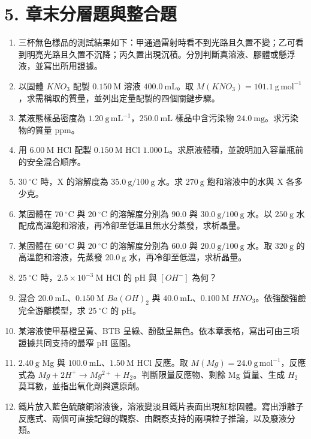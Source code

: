 \documentclass[11pt,a4paper]{article}
\providecommand{\tightlist}{%
  \setlength{\itemsep}{0pt}\setlength{\parskip}{0pt}}
\begin{document}
\section{5. 章末分層題與整合題}\label{ux7ae0ux672bux5206ux5c64ux984cux8207ux6574ux5408ux984c}

\begin{enumerate}
\def\labelenumi{\arabic{enumi}.}
\tightlist
\item
  三杯無色樣品的測試結果如下：甲通過雷射時看不到光路且久置不變；乙可看到明亮光路且久置不沉降；丙久置出現沉積。分別判斷真溶液、膠體或懸浮液，並寫出所用證據。
\item
  以固體 \(KNO_3\) 配製 \(0.150\ \mathrm M\) 溶液 \(400.0\ \mathrm{mL}\)。取 \(M(KNO_3)=101.1\ \mathrm{g\,mol^{-1}}\)，求需稱取的質量，並列出定量配製的四個關鍵步驟。
\item
  某液態樣品密度為 \(1.20\ \mathrm{g\,mL^{-1}}\)，\(250.0\ \mathrm{mL}\) 樣品中含污染物 \(24.0\ \mathrm{mg}\)。求污染物的質量 ppm。
\item
  用 \(6.00\ \mathrm M\) HCl 配製 \(0.150\ \mathrm M\) HCl \(1.000\ \mathrm L\)。求原液體積，並說明加入容量瓶前的安全混合順序。
\item
  \(30\ ^\circ\mathrm C\) 時，X 的溶解度為 \(35.0\ \mathrm g/100\ \mathrm g\) 水。求 \(270\ \mathrm g\) 飽和溶液中的水與 X 各多少克。
\item
  某固體在 \(70\ ^\circ\mathrm C\) 與 \(20\ ^\circ\mathrm C\) 的溶解度分別為 \(90.0\) 與 \(30.0\ \mathrm g/100\ \mathrm g\) 水。以 \(250\ \mathrm g\) 水配成高溫飽和溶液，再冷卻至低溫且無水分蒸發，求析晶量。
\item
  某固體在 \(60\ ^\circ\mathrm C\) 與 \(20\ ^\circ\mathrm C\) 的溶解度分別為 \(60.0\) 與 \(20.0\ \mathrm g/100\ \mathrm g\) 水。取 \(320\ \mathrm g\) 的高溫飽和溶液，先蒸發 \(20.0\ \mathrm g\) 水，再冷卻至低溫，求析晶量。
\item
  \(25\ ^\circ\mathrm C\) 時，\(2.5\times10^{-3}\ \mathrm M\) HCl 的 pH 與 \([OH^-]\) 為何？
\item
  混合 \(20.0\ \mathrm{mL}\)、\(0.150\ \mathrm M\) \(Ba(OH)_2\) 與 \(40.0\ \mathrm{mL}\)、\(0.100\ \mathrm M\) \(HNO_3\)。依強酸強鹼完全游離模型，求 \(25\ ^\circ\mathrm C\) 的 pH。
\item
  某溶液使甲基橙呈黃、BTB 呈綠、酚酞呈無色。依本章表格，寫出可由三項證據共同支持的最窄 pH 區間。
\item
  \(2.40\ \mathrm g\) Mg 與 \(100.0\ \mathrm{mL}\)、\(1.50\ \mathrm M\) HCl 反應。取 \(M(Mg)=24.0\ \mathrm{g\,mol^{-1}}\)，反應式為 \(Mg+2H^+\rightarrow Mg^{2+}+H_2\)。判斷限量反應物、剩餘 Mg 質量、生成 \(H_2\) 莫耳數，並指出氧化劑與還原劑。
\item
  鐵片放入藍色硫酸銅溶液後，溶液變淡且鐵片表面出現紅棕固體。寫出淨離子反應式、兩個可直接記錄的觀察、由觀察支持的兩項粒子推論，以及廢液分類。
\end{enumerate}
\end{document}
